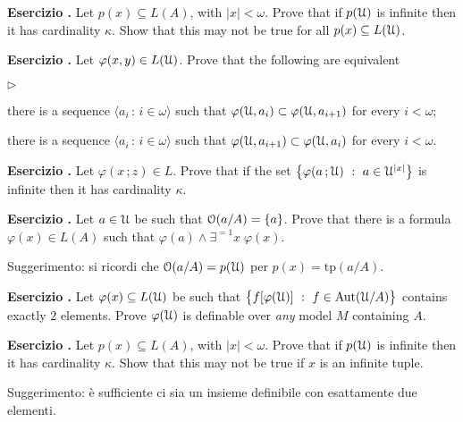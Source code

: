 \documentclass[10pt]{article}
\def\phi{\varphi}
\def\U{\EuScript U}
\def\<{\langle}
\def\>{\rangle}
\def\E{\exists}
\def\Aut{\textrm{Aut}}
\def\tp{\textrm{tp}}
\newcommand{\labella}[1]{{\sf\footnotesize #1}\hfill}
\renewenvironment{itemize}
  {\begin{list}{$\triangleright$}{%
   \setlength{\parskip}{0mm}
   \setlength{\topsep}{0mm}
   \setlength{\rightmargin}{0mm}
   \setlength{\listparindent}{0mm}
   \setlength{\itemindent}{0mm}
   \setlength{\labelwidth}{3ex}
   \setlength{\itemsep}{0mm}
   \setlength{\parsep}{0mm}
   \setlength{\partopsep}{0mm}
   \setlength{\labelsep}{1ex}
   \setlength{\leftmargin}{\labelwidth+\labelsep}
   \let\makelabel\labella}}{%
   \end{list}}
\newcounter{ex}
\newenvironment{exercise}{\clearpage\addtocounter{ex}{1}\textbf{Esercizio \theex.\quad}}{}
\begin{document}
\clearpage%
\setcounter{ex}{0}

\begin{exercise}
Let $p(x)\subseteq L(A)$, with $|x|<\omega$. Prove that if $p(\U)$ is infinite then it has cardinality $\kappa$. Show that this may not be true for all $p(x)\subseteq L(\U)$. 
\end{exercise}


\begin{exercise} 
Let $\phi(x,y)\in L(\U)$. Prove that the following are equivalent
\begin{itemize}
\item[1.] there is a sequence $\<a_i\,:\,i\in\omega\>$ such that $\phi(\U,a_i)\subset\phi(\U,a_{i+1})$ for every $i<\omega$;
\item[2.] there is a sequence $\<a_i\,:\,i\in\omega\>$ such that $\phi(\U,a_{i+1})\subset\phi(\U,a_i)$ for every $i<\omega$.  
\end{itemize}
\end{exercise}



\begin{exercise}
Let $\phi(x\,;z)\in L$. Prove that if the set $\big\{\phi(a\,;\U)\ :\ a\in\U^{|x|}\big\}$ is infinite then it has cardinality $\kappa$.
\end{exercise}


\clearpage%
\setcounter{ex}{0}

\begin{exercise}
Let $a\in\U$ be such that ${\EuScript O}(a/A)=\{a\}$. Prove that there is a formula $\phi(x)\in L(A)$ such that $\phi(a)\wedge\E^{=1}x\;\phi(x)$.

Suggerimento: si ricordi che ${\EuScript O}(a/A)=p(\U)$ per $p(x)=\tp(a/A)$.
\end{exercise}


\begin{exercise}
Let $\phi(x)\subseteq L(\U)$ be such that $\big\{f[\phi(\U)] \ :\ f\in\Aut(\U/A)\big\}$ contains exactly $2$ elements.  Prove $\phi(\U)$ is definable over \textit{any\/} model $M$ containing $A$.
\end{exercise}


\begin{exercise}
Let $p(x)\subseteq L(A)$, with $|x|<\omega$. Prove that if $p(\U)$ is infinite then it has cardinality $\kappa$. Show that this may not be true if $x$ is an infinite tuple. 

Suggerimento: è sufficiente ci sia un insieme definibile con esattamente due elementi.
\end{exercise}
\end{document}

